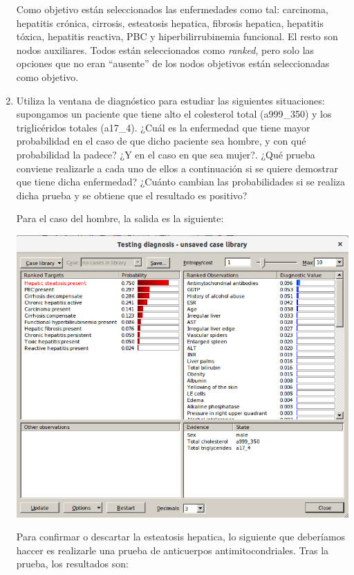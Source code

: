\documentclass{article}
\begin{document}
\begin{enumerate}[label=\alph*)]
Como objetivo están seleccionados las enfermedades como tal: carcinoma, hepatitis crónica, cirrosis, esteatosis hepatica, fibrosis hepatica, hepatitis tóxica, hepatitis reactiva, PBC y hiperbilirrubinemia funcional. El resto son nodos auxiliares. Todos están seleccionados como \textit{ranked}, pero solo las opciones que no eran “ausente” de los nodos objetivos están seleccionadas como objetivo.

\item Utiliza la ventana de diagnóstico para estudiar las siguientes situaciones: supongamos un paciente que tiene alto el colesterol total (a999\_350) y los triglicéridos totales (a17\_4). ¿Cuál es la enfermedad que tiene mayor probabilidad en el caso de que dicho paciente sea hombre, y con qué probabilidad la padece? ¿Y en el caso en que sea mujer?. ¿Qué prueba conviene realizarle a cada uno de ellos a continuación si se quiere demostrar que tiene dicha enfermedad? ¿Cuánto cambian las probabilidades si se realiza dicha prueba y se obtiene que el resultado es positivo?

\newpage

Para el caso del hombre, la salida es la siguiente:

\begin{flushleft}
\includegraphics[scale=0.4]{hepaSOL.png}
\end{flushleft}

Para confirmar o descartar la esteatosis hepatica, lo siguiente que deberíamos haccer es realizarle una prueba de anticuerpos antimitocondriales. Tras la prueba, los resultados son:


\end{enumerate}
\end{document}
